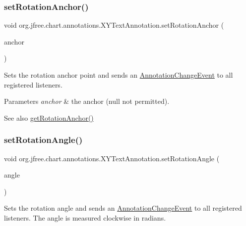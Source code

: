 \subsubsection{\texorpdfstring{set\+Rotation\+Anchor()}{setRotationAnchor()}}
{\footnotesize\ttfamily void org.\+jfree.\+chart.\+annotations.\+X\+Y\+Text\+Annotation.\+set\+Rotation\+Anchor (\begin{DoxyParamCaption}\item[{Text\+Anchor}]{anchor }\end{DoxyParamCaption})}

Sets the rotation anchor point and sends an \mbox{\hyperlink{}{Annotation\+Change\+Event}} to all registered listeners.


\begin{DoxyParams}{Parameters}
{\em anchor} & the anchor ({\ttfamily null} not permitted).\\
\hline
\end{DoxyParams}
\begin{DoxySeeAlso}{See also}
\mbox{\hyperlink{classorg_1_1jfree_1_1chart_1_1annotations_1_1_x_y_text_annotation_acb3aaa58e15cdca9253e36b3a35217fd}{get\+Rotation\+Anchor()}} 
\end{DoxySeeAlso}
\mbox{\label{classorg_1_1jfree_1_1chart_1_1annotations_1_1_x_y_text_annotation_ae7a0ba2a95a356a1b81440986a37f321}} 
\subsubsection{\texorpdfstring{set\+Rotation\+Angle()}{setRotationAngle()}}
{\footnotesize\ttfamily void org.\+jfree.\+chart.\+annotations.\+X\+Y\+Text\+Annotation.\+set\+Rotation\+Angle (\begin{DoxyParamCaption}\item[{double}]{angle }\end{DoxyParamCaption})}

Sets the rotation angle and sends an \mbox{\hyperlink{}{Annotation\+Change\+Event}} to all registered listeners. The angle is measured clockwise in radians.


